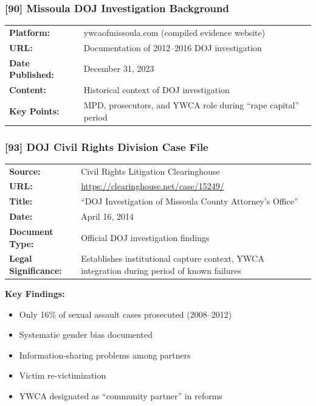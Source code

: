 \documentclass[11pt,letterpaper]{article}
\newcommand{\citeref}[1]{\textbf{\color{NavyBlue}[#1]}}
\begin{document}
\subsubsection{\citeref{90} Missoula DOJ Investigation Background}

\begin{tabular}{@{}p{1.4in}p{4.6in}@{}}
\textbf{Platform:} & ywcaofmissoula.com (compiled evidence website)\\
\textbf{URL:} & Documentation of 2012--2016 DOJ investigation\\
\textbf{Date Published:} & December 31, 2023\\
\textbf{Content:} & Historical context of DOJ investigation\\
\textbf{Key Points:} & MPD, prosecutors, and YWCA role during ``rape capital'' period\\
\end{tabular}

\subsubsection{\citeref{93} DOJ Civil Rights Division Case File}

\begin{tabular}{@{}p{1.4in}p{4.6in}@{}}
\textbf{Source:} & Civil Rights Litigation Clearinghouse\\
\textbf{URL:} & \url{https://clearinghouse.net/case/15249/}\\
\textbf{Title:} & ``DOJ Investigation of Missoula County Attorney's Office''\\
\textbf{Date:} & April 16, 2014\\
\textbf{Document Type:} & Official DOJ investigation findings\\
\textbf{Legal Significance:} & Establishes institutional capture context, YWCA integration during period of known failures\\
\end{tabular}

\vspace{0.1in}

\textbf{Key Findings:}
\begin{itemize}[leftmargin=*]
\item Only 16\% of sexual assault cases prosecuted (2008--2012)
\item Systematic gender bias documented
\item Information-sharing problems among partners
\item Victim re-victimization
\item YWCA designated as ``community partner'' in reforms
\end{itemize}
\end{document}
